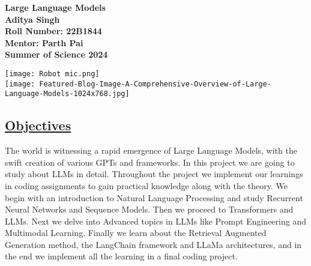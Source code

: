 \documentclass{article}
\begin{document}
\begin{titlepage}
\centering
\vspace{5cm}

\textbf{\Huge Large Language Models} \\
\vspace{0.5cm}
\textbf{\Large Aditya Singh}\\
\vspace{0.5cm}
\textbf{\Large Roll Number: 22B1844}\\
\vspace{0.5cm}
\textbf{\Large Mentor: Parth Pai}\\
\vspace{0.5cm}
\textbf{\Large Summer of Science 2024} \\
\vspace{1cm}

\texttt{[image: Robot mic.png]} \\
\vspace{0.5cm}
\texttt{[image: Featured-Blog-Image-A-Comprehensive-Overview-of-Large-Language-Models-1024x768.jpg]}

\end{titlepage}

\clearpage

\begin{center}
    \section*{\Huge \underline{Objectives}}
\end{center}

\vspace{0.4cm}
\flushleft
\Large
\justifying
The world is witnessing a rapid emergence of Large Language Models, with the swift creation of various GPTs and frameworks. In this project we are going to study about LLMs in detail. Throughout the project we implement our learnings in coding assignments to gain practical knowledge along with the theory. We begin with an introduction to Natural Language Processing and study Recurrent Neural Networks and Sequence Models. Then we proceed to Transformers and LLMs. Next we delve into Advanced topics in LLMs like Prompt Engineering and Multimodal Learning. Finally we learn about the Retrieval Augmented Generation method, the LangChain framework and LLaMa architectures, and in the end we implement all the learning in a final coding project.

\vspace{-0.2cm}
\end{document}
